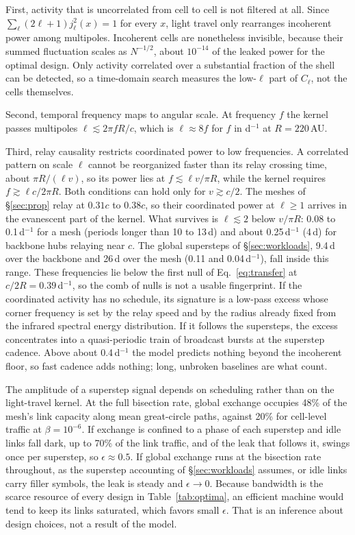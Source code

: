 \documentclass[final,5p]{elsarticle}
\begin{document}
First, activity that is uncorrelated from cell to cell is not filtered at all. Since $\sum_\ell(2\ell+1)j_\ell^2(x)=1$ for every $x$, light travel only rearranges incoherent power among multipoles. Incoherent cells are nonetheless invisible, because their summed fluctuation scales as $N^{-1/2}$, about $10^{-14}$ of the leaked power for the optimal design. Only activity correlated over a substantial fraction of the shell can be detected, so a time-domain search measures the low-$\ell$ part of $C_\ell$, not the cells themselves.

Second, temporal frequency maps to angular scale. At frequency $f$ the kernel passes multipoles $\ell\lesssim2\pi fR/c$, which is $\ell\approx8f$ for $f$ in d$^{-1}$ at $R=220$\,AU.

Third, relay causality restricts coordinated power to low frequencies. A correlated pattern on scale $\ell$ cannot be reorganized faster than its relay crossing time, about $\pi R/(\ell v)$, so its power lies at $f\lesssim\ell v/\pi R$, while the kernel requires $f\gtrsim\ell c/2\pi R$. Both conditions can hold only for $v\gtrsim c/2$. The meshes of \S\ref{sec:prop} relay at $0.31c$ to $0.38c$, so their coordinated power at $\ell\ge1$ arrives in the evanescent part of the kernel. What survives is $\ell\lesssim2$ below $v/\pi R$: 0.08 to 0.1\,d$^{-1}$ for a mesh (periods longer than 10 to 13\,d) and about 0.25\,d$^{-1}$ (4\,d) for backbone hubs relaying near $c$. The global supersteps of \S\ref{sec:workloads}, 9.4\,d over the backbone and 26\,d over the mesh (0.11 and 0.04\,d$^{-1}$), fall inside this range. These frequencies lie below the first null of Eq.~\eqref{eq:transfer} at $c/2R=0.39$\,d$^{-1}$, so the comb of nulls is not a usable fingerprint. If the coordinated activity has no schedule, its signature is a low-pass excess whose corner frequency is set by the relay speed and by the radius already fixed from the infrared spectral energy distribution. If it follows the supersteps, the excess concentrates into a quasi-periodic train of broadcast bursts at the superstep cadence. Above about 0.4\,d$^{-1}$ the model predicts nothing beyond the incoherent floor, so fast cadence adds nothing; long, unbroken baselines are what count.

The amplitude of a superstep signal depends on scheduling rather than on the light-travel kernel. At the full bisection rate, global exchange occupies 48\% of the mesh's link capacity along mean great-circle paths, against 20\% for cell-level traffic at $\beta=10^{-6}$. If exchange is confined to a phase of each superstep and idle links fall dark, up to 70\% of the link traffic, and of the leak that follows it, swings once per superstep, so $\epsilon\approx0.5$. If global exchange runs at the bisection rate throughout, as the superstep accounting of \S\ref{sec:workloads} assumes, or idle links carry filler symbols, the leak is steady and $\epsilon\to0$. Because bandwidth is the scarce resource of every design in Table~\ref{tab:optima}, an efficient machine would tend to keep its links saturated, which favors small $\epsilon$. That is an inference about design choices, not a result of the model.
\end{document}
